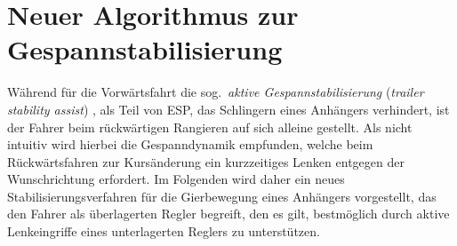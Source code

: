 
\section{Neuer Algorithmus zur Gespannstabilisierung} \label{sec:anhaenger}
Während für die Vorwärtsfahrt die sog.\ \emph{aktive Gespannstabilisierung} (\emph{trailer stability assist}) \cite{BHB2012_vanZanten_bremsanlage}, \iA als Teil von ESP, das Schlingern eines Anhängers verhindert, ist der Fahrer beim rückwärtigen Rangieren auf sich alleine gestellt.
%
Als nicht intuitiv wird hierbei die %
Gespanndynamik empfunden, welche beim Rückwärtsfahren zur Kursänderung ein kurzzeitiges Lenken entgegen der Wunschrichtung erfordert. %
Im Folgenden wird daher ein neues Stabilisierungsverfahren  für die Gierbewegung eines Anhängers vorgestellt, das den Fahrer als überlagerten Regler begreift, den es gilt, bestmöglich durch aktive Lenkeingriffe eines unterlagerten Reglers zu unterstützen. 

